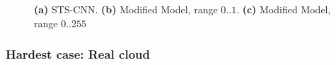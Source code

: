 \begin{figure}[h!]
	\centering

	\centering
	\caption{
		\textbf{(a)} STS-CNN.
		\textbf{(b)} Modified Model, range $0..1$.
		\textbf{(c)} Modified Model, range $0..255$}
\end{figure}

\subsubsection{Hardest case: Real cloud}

